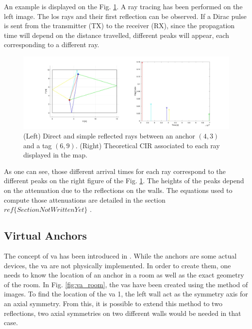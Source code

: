 An example is displayed on the Fig. \ref{fig:cir_ex1}. A ray tracing has been performed on the left image. The \gls{los} rays and their first reflection can be observed. If a Dirac pulse is sent from the transmitter (TX) to the receiver (RX), since the propagation time will depend on the distance travelled, different peaks will appear, each corresponding to a different ray.

\begin{figure}[H]
	\centering
	\includegraphics[width=.95\linewidth]{Images/Anchor-mpc.jpg}
	\caption{(Left) Direct and simple reflected rays between an anchor $(4, 3)$ and a tag $(6, 9)$. (Right) Theoretical CIR associated to each ray displayed in the map. 	\label{fig:cir_ex1}}

\end{figure}

As one can see, those different arrival times for each ray correspond to the different peaks on the right figure of the Fig. \ref{fig:cir_ex1}. The heights of the peaks depend on the attenuation due to the reflections on the walls. The equations used to compute those attenuations are detailed in the section \color{red} $ref\{SectionNotWrittenYet\}$ \color{black}. 

\subsection{Virtual Anchors}

The concept of \gls{va} has been introduced in  \cite{meissner2010uwb}. While the anchors are some actual devices, the \gls{va} are not physically implemented. In order to create them, one needs to know the location of an anchor in a room as well as the exact geometry of the room. In Fig. \ref{fig:va_room}, the \glspl{va} have been created using the method of images. To find the location of the \gls{va} 1, the left wall act as the symmetry axis for an axial symmetry. From this, it is possible to extend this method to two reflections, two axial symmetries on two different walls would be needed in that case.

